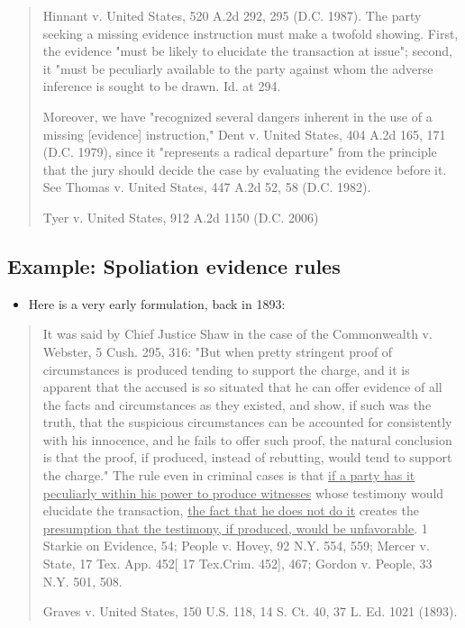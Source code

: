 \documentclass[
  10pt,
  dvipsnames,enabledeprecatedfontcommands]{scrartcl}
\providecommand{\tightlist}{%
  \setlength{\itemsep}{0pt}\setlength{\parskip}{0pt}}
\begin{document}
\begin{quote} 
Hinnant v. United States, 520 A.2d 292, 295 (D.C. 1987). The party seeking a missing evidence instruction must make a twofold showing. First, the evidence "must be likely to elucidate the transaction at issue"; second, it "must be peculiarly available to the party against whom the adverse inference is sought to be drawn. Id. at 294.

Moreover, we have "recognized several dangers inherent in the use of a missing [evidence] instruction," Dent v. United States, 404 A.2d 165, 171 (D.C. 1979), since it "represents a radical departure" from the principle that the jury should decide the case by evaluating the evidence before it. See Thomas v. United States, 447 A.2d 52, 58 (D.C. 1982).

Tyer v. United States, 912 A.2d 1150 (D.C. 2006)
\end{quote}


\hypertarget{example-spoliation-evidence-rules}{%
\subsection{Example: Spoliation evidence
rules}\label{example-spoliation-evidence-rules}}

\begin{itemize}
\tightlist
\item
  Here is a very early formulation, back in 1893:
\end{itemize}

\begin{quote}
It was said by Chief Justice Shaw in the case of the Commonwealth v. Webster, 5 Cush. 295, 316: "But when pretty stringent proof of circumstances is produced tending to support the charge, and it is apparent that the accused is so situated that he can offer evidence of all the facts and circumstances as they existed, and show, if such was the truth, that the suspicious circumstances  can be accounted for consistently with his innocence, and he fails to offer such proof, the natural conclusion is that the proof, if produced, instead of rebutting, would tend to support the charge." The rule even in criminal cases is that \underline{if a party has it peculiarly within his power to produce witnesses} whose testimony would elucidate the transaction, \underline{the fact that he does not do it} creates the \underline{presumption that the testimony, if produced, would be unfavorable}. 1 Starkie on Evidence, 54; People v. Hovey, 92 N.Y. 554, 559; Mercer v. State, 17 Tex. App. 452[ 17 Tex.Crim. 452], 467; Gordon v. People, 33 N.Y. 501, 508.

Graves v. United States, 150 U.S. 118, 14 S. Ct. 40, 37 L. Ed. 1021 (1893).
\end{quote}
\end{document}

